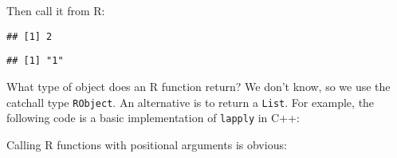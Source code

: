 Then call it from R:

\begin{Shaded}
\begin{Highlighting}[]
\NormalTok{(}\OperatorTok{+}\StringTok{ }\NormalTok{)}
\end{Highlighting}
\end{Shaded}

\begin{verbatim}
## [1] 2
\end{verbatim}

\begin{Shaded}
\begin{Highlighting}[]
\end{Highlighting}
\end{Shaded}

\begin{verbatim}
## [1] "1"
\end{verbatim}

What type of object does an R function return? We don't know, so we use
the catchall type \texttt{RObject}. An alternative is to return a
\texttt{List}. For example, the following code is a basic implementation
of \texttt{lapply} in C++:

\begin{Shaded}
\begin{Highlighting}[]
 


  \NormalTok{(}
\NormalTok{  \}}

\NormalTok{\}}
\end{Highlighting}
\end{Shaded}

Calling R functions with positional arguments is obvious:

\begin{Shaded}
\begin{Highlighting}[]
\NormalTok{, }\NormalTok{);}
\end{Highlighting}
\end{Shaded}

